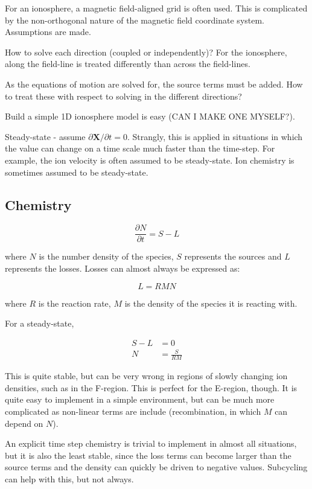 \documentclass[
  notoc %
]{tufte-book}
\begin{document}
For an ionosphere, a magnetic field-aligned grid is often used. This is
complicated by the non-orthogonal nature of the magnetic field
coordinate system. Assumptions are made.

How to solve each direction (coupled or independently)? For the
ionosphere, along the field-line is treated differently than across the
field-lines.

As the equations of motion are solved for, the source terms must be
added. How to treat these with respect to solving in the different
directions?

Build a simple 1D ionosphere model is easy (CAN I MAKE ONE MYSELF?).

Steady-state - assume \(\partial \mathbf{X}/\partial t = 0\). Strangly,
this is applied in situations in which the value can change on a time
scale much faster than the time-step. For example, the ion velocity is
often assumed to be steady-state. Ion chemistry is sometimes assumed to
be steady-state.

\hypertarget{chemistry}{%
\subsection{Chemistry}\label{chemistry}}

\[
\frac{\partial N}{\partial t} = S - L
\]

where \(N\) is the number density of the species, \(S\) represents the
sources and \(L\) represents the losses. Losses can almost always be
expressed as:

\[
L = RMN
\]

where \(R\) is the reaction rate, \(M\) is the density of the species it
is reacting with.

For a steady-state,

\[
\begin{aligned}
S - L &= 0 \\
N &= \frac{S}{RM}
\end{aligned}
\]

This is quite stable, but can be very wrong in regions of slowly
changing ion densities, such as in the F-region. This is perfect for the
E-region, though. It is quite easy to implement in a simple environment,
but can be much more complicated as non-linear terms are include
(recombination, in which \(M\) can depend on \(N\)).

An explicit time step chemistry is trivial to implement in almost all
situations, but it is also the least stable, since the loss terms can
become larger than the source terms and the density can quickly be
driven to negative values. Subcycling can help with this, but not
always.
\end{document}
